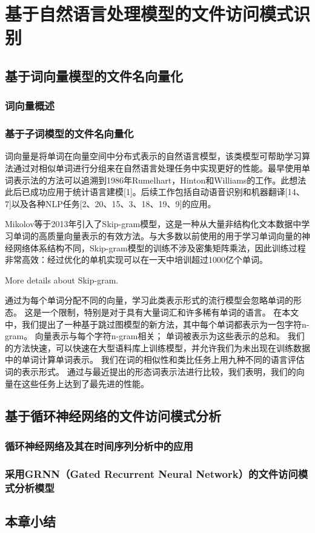 \chapter{基于自然语言处理模型的文件访问模式识别}

\section{基于词向量模型的文件名向量化}
\subsection{词向量概述}
\subsection{基于子词模型的文件名向量化}

词向量是将单词在向量空间中分布式表示的自然语言模型，该类模型可帮助学习算法通过对相似单词进行分组来在自然语言处理任务中实现更好的性能。{\color{orange}最早使用单词表示法的方法可以追溯到1986年Rumelhart，Hinton和Williams的工作}。此想法此后已成功应用于统计语言建模[1]。后续工作包括自动语音识别和机器翻译[14、7]以及各种NLP任务[2、20、15、3、18、19、9]的应用。

Mikolov等于2013年引入了Skip-gram模型，这是一种从大量非结构化文本数据中学习单词的高质量向量表示的有效方法。与大多数以前使用的用于学习单词向量的神经网络体系结构不同，Skip-gram模型的训练不涉及密集矩阵乘法，因此训练过程非常高效：经过优化的单机实现可以在一天中培训超过1000亿个单词。

{\color{red}More details about Skip-gram.}

{\color{orange}通过为每个单词分配不同的向量，学习此类表示形式的流行模型会忽略单词的形态。 这是一个限制，特别是对于具有大量词汇和许多稀有单词的语言。 在本文中，我们提出了一种基于跳过图模型的新方法，其中每个单词都表示为一包字符n-gram。 向量表示与每个字符n-gram相关； 单词被表示为这些表示的总和。 我们的方法快速，可以快速在大型语料库上训练模型，并允许我们为未出现在训练数据中的单词计算单词表示。 我们在词的相似性和类比任务上用九种不同的语言评估词的表示形式。 通过与最近提出的形态词表示法进行比较，我们表明，我们的向量在这些任务上达到了最先进的性能。}

\section{基于循环神经网络的文件访问模式分析}
\subsection{循环神经网络及其在时间序列分析中的应用}
\subsection{采用GRNN（Gated Recurrent Neural Network）的文件访问模式分析模型}
\section{本章小结}